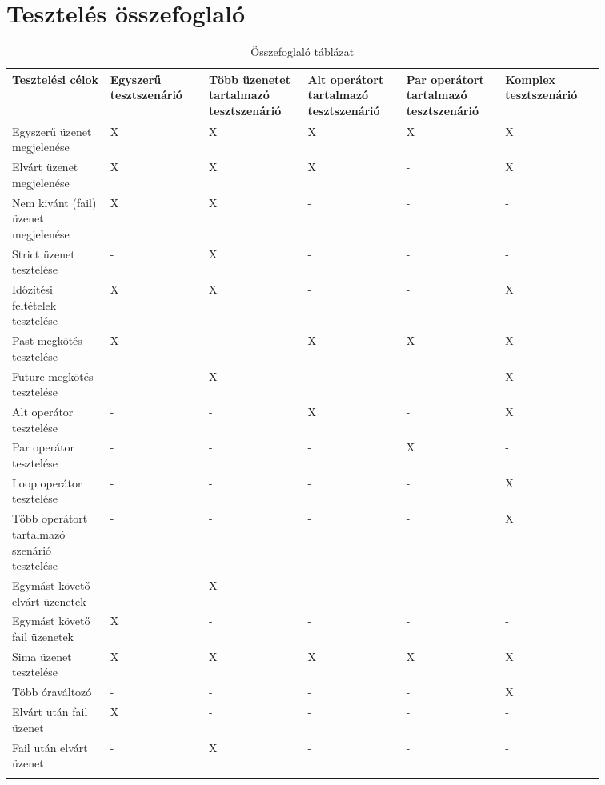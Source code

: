 \clearpage\section{Tesztelés összefoglaló}

\begin{longtable}{|p{0.1428\linewidth}|p{0.1428\linewidth}|p{0.1428\linewidth}|p{0.1428\linewidth}|p{0.1428\linewidth}|p{0.1428\linewidth}|}
\hline
\textbf{Tesztelési célok} & \textbf{Egyszerű tesztszenárió} & \textbf{Több üzenetet tartalmazó tesztszenárió} & \textbf{Alt operátort tartalmazó tesztszenárió} & \textbf{Par operátort tartalmazó tesztszenárió} & \textbf{Komplex tesztszenárió}\\
\hline
Egyszerű üzenet megjelenése & X & X & X & X & X\\
\hline
Elvárt üzenet megjelenése & X & X & X & - & X\\
\hline
Nem kivánt (fail) üzenet megjelenése & X & X & - & - & -\\
\hline
Strict üzenet tesztelése & - & X & - & - & -\\
\hline
Időzítési feltételek tesztelése & X & X & - & - & X\\
\hline
Past megkötés tesztelése & X & - & X & X & X\\
\hline
Future megkötés tesztelése & - & X & - & - & X\\
\hline
Alt operátor tesztelése & - & - & X & - & X\\
\hline
Par operátor tesztelése & - & - & - & X & -\\
\hline
Loop operátor tesztelése & - & - & - & - & X\\
\hline
Több operátort tartalmazó szenárió tesztelése & - & - & - & - & X\\
\hline
Egymást követő elvárt üzenetek & - & X & - & - & -\\
\hline
Egymást követő fail üzenetek & X & - & - & - & -\\
\hline
Sima üzenet tesztelése & X & X & X & X & X\\
\hline
Több óraváltozó & - & - & - & - & X\\
\hline
Elvárt után fail üzenet & X & - & - & - & -\\
\hline
Fail után elvárt üzenet & - & X & - & - & -\\
\hline
\caption{Összefoglaló táblázat}
\label{tab:table1}
\end{longtable}